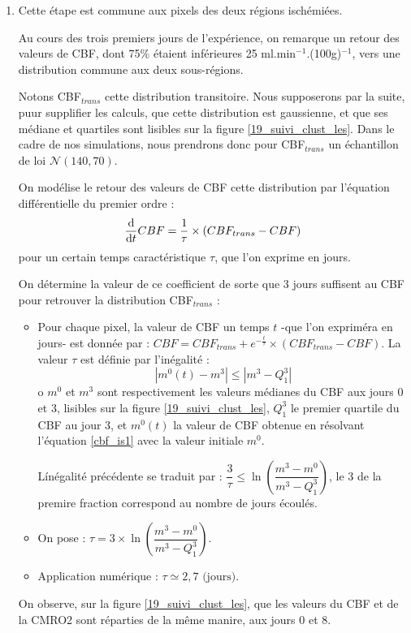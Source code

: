 \begin{enumerate}[label=\textbf{(L\'esion 1 - \arabic*)}]
\item Cette \'etape est commune aux pixels des deux r\'egions isch\'emi\'ees.

\par
Au cours des trois premiers jours de l'exp\'erience, on remarque un retour des valeurs de CBF, %
dont 75\% \'etaient inf\'erieures  25 ml.min${}^{-1}$.(100g)${}^{-1}$, vers une distribution commune aux deux sous-r\'egions.

\par
Notons CBF${}_{trans}$ cette distribution transitoire. Nous supposerons par la suite, puur supplifier les calculs, %
que cette distribution est gaussienne, et que ses m\'ediane et quartiles sont lisibles sur la figure \ref{19_suivi_clust_les}. %
Dans le cadre de nos simulations, nous prendrons donc pour CBF${}_{trans}$ un \'echantillon de loi $\mathcal{N}(140,70)$.

\par
On mod\'elise le retour des valeurs de CBF  cette distribution par l'\'equation diff\'erentielle du premier ordre :
\begin{equation}
\der{CBF}=\frac{1}{\tau}\times \left(CBF_{trans}-CBF\right)%
\label{cbf_is1}
\end{equation}
pour un certain temps caract\'eristique $\tau$, que l'on exprime en jours.

\par
On d\'etermine la valeur de ce coefficient de sorte que 3 jours suffisent au CBF pour retrouver la distribution CBF${}_{trans}$ :
\begin{itemize}
\item Pour chaque pixel, la valeur de CBF  un temps $t$ -que l'on exprim\'era en jours- est donn\'ee par : %
$CBF=CBF_{trans}+e^{-\frac{t}{\tau}}\times\left(CBF_{trans}-CBF\right)$. La valeur $\tau$ est d\'efinie par l'in\'egalit\'e :
\[|m^0(t)-m^3|\leq|m^3-Q_1^3|\]
o $m^0$ et $m^3$ sont respectivement les valeurs m\'edianes du CBF aux jours 0 et 3, lisibles sur la figure \ref{19_suivi_clust_les}, %
$Q_1^3$ le premier quartile du CBF au jour 3, et $m^0(t)$ la valeur de CBF obtenue en r\'esolvant l'\'equation \ref{cbf_is1} avec la valeur initiale $m^0$.

\par
L\'in\'egalit\'e pr\'ec\'edente se traduit par : $\dfrac{3}{\tau}\leq\ln\left(\dfrac{m^3-m^0}{m^3-Q^3_1}\right)$, %
le 3 de la premire fraction correspond au nombre de jours \'ecoul\'es.
%
\item On pose : $\tau =3\times\ln\left(\dfrac{m^3-m^0}{m^3-Q^3_1}\right)$.
%
\item Application num\'erique : $\tau \simeq 2,7 \text{ (jours)}$.
\end{itemize}
%
On observe, sur la figure \ref{19_suivi_clust_les}, que les valeurs du CBF et de la CMRO2 sont r\'eparties de la m\^eme manire, %
aux jours 0 et 8.


\end{enumerate}
